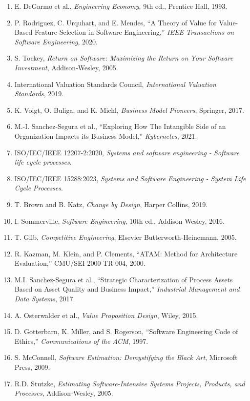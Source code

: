 \documentclass[a4paper,11pt]{ltjsarticle}
\numberwithin{figure}{section}
\numberwithin{table}{section}
\begin{document}
\begin{enumerate}
  \item E. DeGarmo et al., \textit{Engineering Economy}, 9th ed., Prentice Hall, 1993.
  \item P. Rodriguez, C. Urquhart, and E. Mendes, ``A Theory of Value for Value-Based Feature Selection in Software Engineering,'' \textit{IEEE Transactions on Software Engineering}, 2020.
  \item S. Tockey, \textit{Return on Software: Maximizing the Return on Your Software Investment}, Addison-Wesley, 2005.
  \item International Valuation Standards Council, \textit{International Valuation Standards}, 2019.
  \item K. Voigt, O. Buliga, and K. Michl, \textit{Business Model Pioneers}, Springer, 2017.
  \item M.-I. Sanchez-Segura et al., ``Exploring How The Intangible Side of an Organization Impacts its Business Model,'' \textit{Kybernetes}, 2021.
  \item ISO/IEC/IEEE 12207-2:2020, \textit{Systems and software engineering - Software life cycle processes}.
  \item ISO/IEC/IEEE 15288:2023, \textit{Systems and Software Engineering - System Life Cycle Processes}.
  \item T. Brown and B. Katz, \textit{Change by Design}, Harper Collins, 2019.
  \item I. Sommerville, \textit{Software Engineering}, 10th ed., Addison-Wesley, 2016.
  \item T. Gilb, \textit{Competitive Engineering}, Elsevier Butterworth-Heinemann, 2005.
  \item R. Kazman, M. Klein, and P. Clements, ``ATAM: Method for Architecture Evaluation,'' CMU/SEI-2000-TR-004, 2000.
  \item M.I. Sanchez-Segura et al., ``Strategic Characterization of Process Assets Based on Asset Quality and Business Impact,'' \textit{Industrial Management and Data Systems}, 2017.
  \item A. Osterwalder et al., \textit{Value Proposition Design}, Wiley, 2015.
  \item D. Gotterbarn, K. Miller, and S. Rogerson, ``Software Engineering Code of Ethics,'' \textit{Communications of the ACM}, 1997.
  \item S. McConnell, \textit{Software Estimation: Demystifying the Black Art}, Microsoft Press, 2009.
  \item R.D. Stutzke, \textit{Estimating Software-Intensive Systems Projects, Products, and Processes}, Addison-Wesley, 2005.

\end{enumerate}
\end{document}
